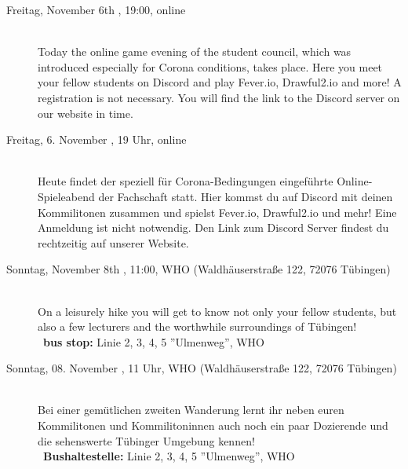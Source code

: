 \begin{description}


\ifml
    \item[Freitag, November 6th \YEAR, 19:00, online]\ \\
    Today the online game evening of the student council, which was introduced especially for Corona conditions, takes place. Here you meet your fellow students on Discord and play Fever.io, Drawful2.io and more! A registration is not necessary. You will find the link to the Discord server on our website in time.
\else
    \item[Freitag, 6. November \YEAR, 19 Uhr, online]\ \\
        Heute findet der speziell für Corona-Bedingungen eingeführte Online-Spieleabend der Fachschaft statt. Hier kommst du auf Discord mit deinen Kommilitonen zusammen und spielst Fever.io, Drawful2.io und mehr! Eine Anmeldung ist nicht notwendig. Den Link zum Discord Server findest du rechtzeitig auf unserer Website.
\fi

\ifml
    \item[Sonntag, November 8th \YEAR, 11:00, WHO (Waldhäuserstraße 122, 72076 Tübingen)]\ \\
    On a leisurely hike you will get to know not only your fellow students, but also a few lecturers and the worthwhile surroundings of Tübingen!\\
    ~\textbf{bus stop:} Linie 2, 3, 4, 5 ''Ulmenweg'', WHO
\else
    \item[Sonntag, 08. November \YEAR, 11 Uhr, WHO (Waldhäuserstraße 122, 72076 Tübingen)]\ \\
        Bei einer gemütlichen zweiten Wanderung lernt ihr neben euren Kommilitonen und Kommilitoninnen auch noch ein paar Dozierende und die sehenswerte Tübinger Umgebung kennen!\\
        ~\textbf{Bushaltestelle:} Linie 2, 3, 4, 5 ''Ulmenweg'', WHO
\fi


\end{description}
